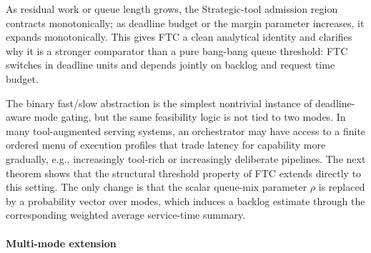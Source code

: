 \documentclass[preprint,12pt]{elsarticle}
\begin{document}
As residual work or queue length grows, the Strategic-tool admission region contracts monotonically; as deadline budget or the margin parameter increases, it expands monotonically. This gives FTC a clean analytical identity and clarifies why it is a stronger comparator than a pure bang-bang queue threshold: FTC switches in deadline units and depends jointly on backlog and request time budget.

The binary fast/slow abstraction is the simplest nontrivial instance of deadline-aware mode gating, but the same feasibility logic is not tied to two modes. In many tool-augmented serving systems, an orchestrator may have access to a finite ordered menu of execution profiles that trade latency for capability more gradually, e.g., increasingly tool-rich or increasingly deliberate pipelines. The next theorem shows that the structural threshold property of FTC extends directly to this setting. The only change is that the scalar queue-mix parameter $\rho$ is replaced by a probability vector over modes, which induces a backlog estimate through the corresponding weighted average service-time summary.

\paragraph{Multi-mode extension}
\label{sec:ftc_multimode}
\end{document}

